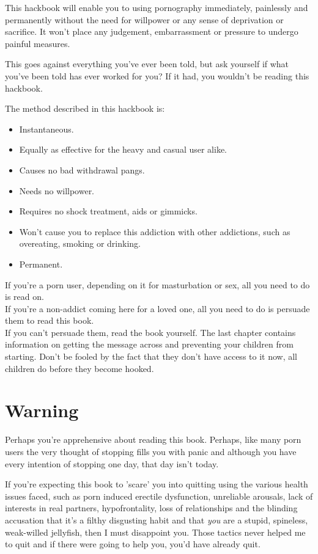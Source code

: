 \documentclass[easypeasy.tex]{subfiles}
\begin{document}
This hackbook will enable you to using pornography immediately, painlessly and permanently without the need for willpower or any sense of deprivation or sacrifice. It won't place any judgement, embarrassment or pressure to undergo painful measures.

This goes against everything you've ever been told, but ask yourself if what you've been told has ever worked for you? If it had, you wouldn't be reading this hackbook.

The method described in this hackbook is:
\begin{itemize}
\item Instantaneous.
\item Equally as effective for the heavy and casual user alike.
\item Causes no bad withdrawal pangs.
\item Needs no willpower.
\item Requires no shock treatment, aids or gimmicks.
\item Won't cause you to replace this addiction with other addictions, such as overeating, smoking or drinking.
\item Permanent.
\end{itemize}

If you're a porn user, depending on it for masturbation or sex, all you need to do is read on. \\
If you're a non-addict coming here for a loved one, all you need to do is persuade them to read this book. \\
If you can't persuade them, read the book yourself. The last chapter contains information on getting the message across and preventing your children from starting. Don't be fooled by the fact that they don't have access to it now, all children do before they become hooked.

\section{Warning}
Perhaps you're apprehensive about reading this book. Perhaps, like many porn users the very thought of stopping fills you with panic and although you have every intention of stopping one day, that day isn't today.

If you're expecting this book to 'scare' you into quitting using the various health issues faced, such as porn induced erectile dysfunction, unreliable arousals, lack of interests in real partners, hypofrontality, loss of relationships and the blinding accusation that it's a filthy disgusting habit and that \textit{you} are a stupid, spineless, weak-willed jellyfish, then I must disappoint you. Those tactics never helped me to quit and if there were going to help you, you'd have already quit.
\end{document}
